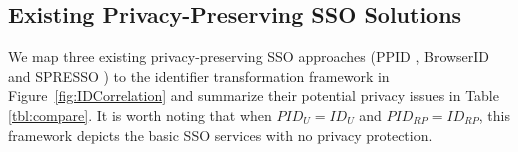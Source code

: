 %







\subsection{Existing Privacy-Preserving SSO Solutions}
We map three existing privacy-preserving SSO approaches (PPID \cite{OpenIDConnect}, BrowserID \cite{BrowserID} and SPRESSO \cite{SPRESSO}) to the identifier transformation framework in Figure~\ref{fig:IDCorrelation} and summarize their potential privacy issues in Table \ref{tbl:compare}. It is worth noting that when $PID_U = ID_U$ and $PID_{RP} = ID_{RP}$, this framework depicts the basic SSO services with no privacy protection.


